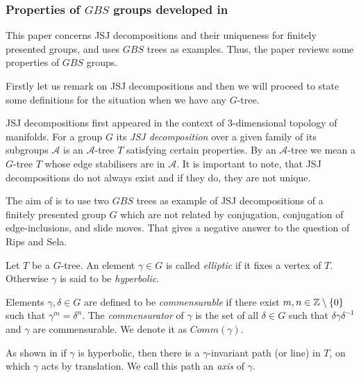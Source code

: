 \subsubsection{Properties of $GBS$ groups developed in \cite{For03}}
\label{JSJ} %
This paper concerns JSJ decompositions and their uniqueness for finitely presented groups, and uses $GBS$ trees as examples. Thus, the paper reviews some properties of $GBS$ groups.

Firstly let us remark on JSJ decompositions and then we will proceed to state some definitions for the situation when we have any $G$-tree.

\begin{remark}\cite{GuLe17}
    JSJ decompositions first appeared in the context of 3-dimensional topology of manifolds. For a group $G$ its \emph{JSJ decomposition} over a given family of its subgroups $\mathcal{A}$ is an $\mathcal{A}$-tree $T$ satisfying certain properties. By an $\mathcal{A}$-tree we mean a $G$-tree $T$ whose edge stabilisers are in $\mathcal{A}$. It is important to note, that JSJ decompositions do not always exist and if they do, they are not unique.

    The aim of \cite{For03} is to use two $GBS$ trees as example of JSJ decompositions of a finitely presented group $G$ which are not related by conjugation, conjugation of edge-inclusions, and slide moves. That gives a negative answer to the question of Rips and Sela.
\end{remark}

\begin{definition}
    Let $T$ be a $G$-tree. An element $\gamma \in G$ is called \emph{elliptic} if it fixes a vertex of $T$. Otherwise $\gamma$ is said to be \emph{hyperbolic}.
    
    Elements $\gamma,\delta \in G$ are defined to be \emph{commensurable} if there exist $m,n \in \mathbb{Z}\setminus \{0\}$ such that $\gamma^m = \delta^n$. The \emph{commensurator} of $\gamma$ is the set of all $\delta \in G$ such that $\delta\gamma\delta^{-1}$ and $\gamma$ are commensurable. We denote it as $Comm(\gamma)$.
\end{definition}

\begin{remark}
    As shown in \cite[Proposition 24]{serre_trees_1980} if $\gamma$ is hyperbolic, then there is a $\gamma$-invariant path (or line) in $T$, on which $\gamma$ acts by translation. We call this path an \emph{axis} of $\gamma$.
\end{remark}

